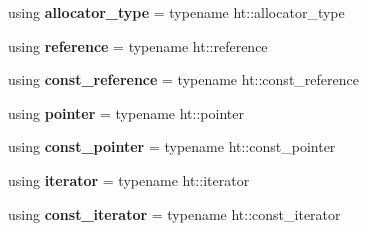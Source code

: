 \begin{DoxyCompactItemize}
using {\bfseries allocator\+\_\+type} = typename ht\+::allocator\+\_\+type
\item 
\mbox{\label{classtsl_1_1robin__set_a73d6e0f76008ad68612fb31b2199f13b}} 
using {\bfseries reference} = typename ht\+::reference
\item 
\mbox{\label{classtsl_1_1robin__set_a3059ef3803dcf3bf450ee3f0f8baef5a}} 
using {\bfseries const\+\_\+reference} = typename ht\+::const\+\_\+reference
\item 
\mbox{\label{classtsl_1_1robin__set_a141684c4bc5ec83649a2864ab5dcd461}} 
using {\bfseries pointer} = typename ht\+::pointer
\item 
\mbox{\label{classtsl_1_1robin__set_abb4e88e615e8086808a6d90315c5dbbe}} 
using {\bfseries const\+\_\+pointer} = typename ht\+::const\+\_\+pointer
\item 
\mbox{\label{classtsl_1_1robin__set_a7f039d680a15fc92ea579474f13c19bc}} 
using {\bfseries iterator} = typename ht\+::iterator
\item 
\mbox{\label{classtsl_1_1robin__set_a60989fb703380eafcf4f952028045189}} 
using {\bfseries const\+\_\+iterator} = typename ht\+::const\+\_\+iterator
\end{DoxyCompactItemize}
